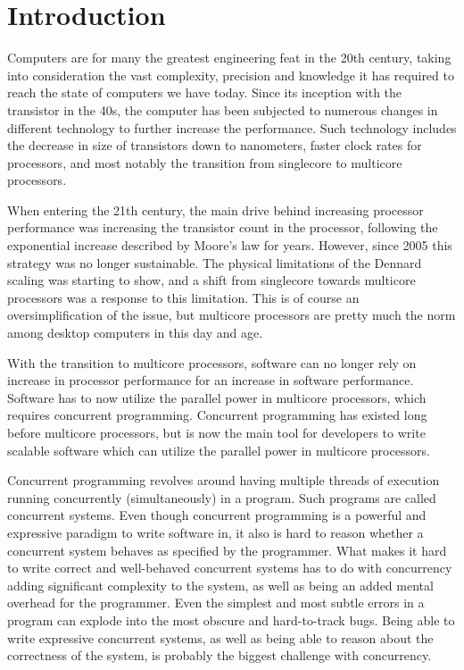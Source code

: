 
\chapter{Introduction}
\label{ch:introduction}

Computers are for many the greatest engineering feat in the 20th century, taking into consideration the vast complexity, precision and knowledge it has required to reach the state of computers we have today. Since its inception with the transistor in the 40s, the computer has been subjected to numerous changes in different technology to further increase the performance. Such technology includes the decrease in size of transistors down to nanometers, faster clock rates for processors, and most notably the transition from singlecore to multicore processors.

When entering the 21th century, the main drive behind increasing processor performance was increasing the transistor count in the processor, following the exponential increase described by Moore's law for years. However, since 2005 this strategy was no longer sustainable. The physical limitations of the Dennard scaling was starting to show, and a shift from singlecore towards multicore processors was a response to this limitation. This is of course an oversimplification of the issue, but multicore processors are pretty much the norm among desktop computers in this day and age.

With the transition to multicore processors, software can no longer rely on increase in processor performance for an increase in software performance. Software has to now utilize the parallel power in multicore processors, which requires concurrent programming. Concurrent programming has existed long before multicore processors, but is now the main tool for developers to write scalable software which can utilize the parallel power in multicore processors.

Concurrent programming revolves around having multiple threads of execution running concurrently (simultaneously) in a program. Such programs are called concurrent systems. Even though concurrent programming is a powerful and expressive paradigm to write software in, it also is hard to reason whether a concurrent system behaves as specified by the programmer. What makes it hard to write correct and well\hyp{}behaved concurrent systems has to do with concurrency adding significant complexity to the system, as well as being an added mental overhead for the programmer. Even the simplest and most subtle errors in a program can explode into the most obscure and hard\hyp{}to\hyp{}track bugs. Being able to write expressive concurrent systems, as well as being able to reason about the correctness of the system, is probably the biggest challenge with concurrency.

